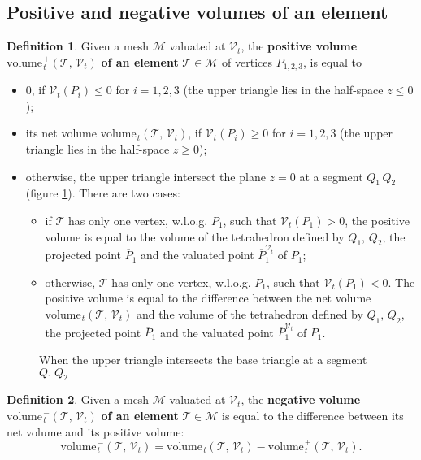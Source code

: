 \documentclass{article}
\theoremstyle{definition}
\newtheorem{defn}{Definition}
\newcommand{\MM}{\mathcal{M}}
\newcommand{\VV}{\mathcal{V}}
\newcommand{\TT}{\mathcal{T}}
\newcommand{\vol}{\mathrm{volume\hspace{1pt}}}
\begin{document}
\subsection{Positive and negative volumes of an element}
\begin{defn}
Given a mesh $\MM$ valuated at $\VV_t$, the \textbf{positive volume} $\vol_t^+(\TT,\,\VV_t)$ \textbf{of an element} $\TT\in\MM$ of vertices $P_{1,2,3}$, is equal to
\begin{itemize}
\item 0, if $\VV_t(P_i) \leqslant 0$ for $i=1,2,3$ (the upper triangle lies in the half-space $z\leqslant0$);
\item its net volume $\vol_t(\TT,\,\VV_t)$, if $\VV_t(P_i) \geqslant 0$ for $i=1,2,3$ (the upper triangle lies in the half-space $z\geqslant 0$);
\item otherwise, the upper triangle intersect the plane $z=0$ at a segment $Q_1\,Q_2$ (figure \ref{fig:positive-volume}). There are two cases:
\begin{itemize}
\item if $\TT$ has only one vertex, w.l.o.g. $P_1$, such that $\VV_t(P_1) > 0$, the positive volume is equal to the volume of the tetrahedron defined by $Q_1,\,Q_2$, the projected point $\overline{P}_1$ and the valuated point $\overline{P}_1^{\VV_t}$ of $P_1$;
\item otherwise, $\TT$ has only one vertex, w.l.o.g. $P_1$, such that $\VV_t(P_1) < 0$. The positive volume is equal to the difference between the net volume $\vol_t(\TT,\,\VV_t)$ and the volume of the tetrahedron defined by $Q_1,\,Q_2$, the projected point $\overline{P}_1$ and the valuated point $\overline{P}_1^{\VV_t}$ of $P_1$.
\end{itemize}
\end{itemize}
\end{defn}
\begin{figure}[ht!]
\centering 
  \caption{When the upper triangle intersects the base triangle at a segment $Q_1\,Q_2$}
  \label{fig:positive-volume}
\end{figure}

\begin{defn}
Given a mesh $\MM$ valuated at $\VV_t$, the \textbf{negative volume} $\vol_t^-(\TT,\,\VV_t)$ \textbf{of an element} $\TT\in\MM$ is equal to the difference between its net volume and its positive volume:
\[\vol_t^-(\TT,\,\VV_t) =  \vol_t(\TT,\,\VV_t) -  \vol_t^+(\TT,\,\VV_t).\]
\end{defn}
\end{document}
